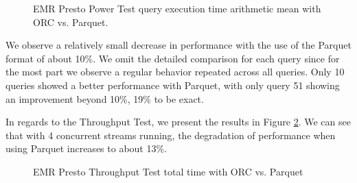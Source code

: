 \begin{figure}
   \begin{center}
   \end{center}
   \caption{EMR Presto Power Test query execution time arithmetic mean with ORC vs. Parquet.}
   \label{fig:additionalResultsPrestoORCvsParquetPowerTestArithmeticMean}
\end{figure}

We observe a relatively small decrease in performance with the use of the Parquet format of about 10\%. We omit the detailed comparison for each query since for the most part we observe a regular behavior repeated across all queries. Only 10 queries showed a better performance with Parquet, with only query 51 showing an improvement beyond 10\%, 19\% to be exact.

In regards to the Throughput Test, we present the results in Figure \ref{fig:additionalResultsPrestoORCvsParquetTputTest}. We can see that with 4 concurrent streams running, the degradation of performance when using Parquet increases to about 13\%.

\begin{figure}
   \begin{center}
   \end{center}
   \caption{EMR Presto Throughput Test total time with ORC vs. Parquet}
   \label{fig:additionalResultsPrestoORCvsParquetTputTest}
\end{figure}

